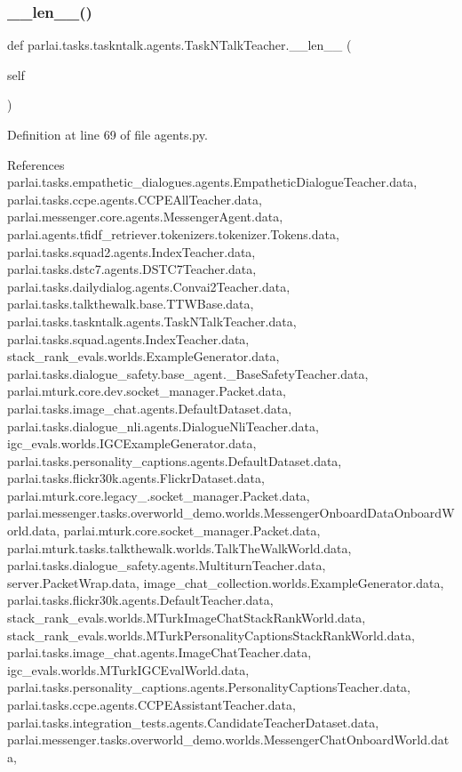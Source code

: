 \subsubsection{\texorpdfstring{\+\_\+\+\_\+len\+\_\+\+\_\+()}{\_\_len\_\_()}}
{\footnotesize\ttfamily def parlai.\+tasks.\+taskntalk.\+agents.\+Task\+N\+Talk\+Teacher.\+\_\+\+\_\+len\+\_\+\+\_\+ (\begin{DoxyParamCaption}\item[{}]{self }\end{DoxyParamCaption})}



Definition at line 69 of file agents.\+py.



References parlai.\+tasks.\+empathetic\+\_\+dialogues.\+agents.\+Empathetic\+Dialogue\+Teacher.\+data, parlai.\+tasks.\+ccpe.\+agents.\+C\+C\+P\+E\+All\+Teacher.\+data, parlai.\+messenger.\+core.\+agents.\+Messenger\+Agent.\+data, parlai.\+agents.\+tfidf\+\_\+retriever.\+tokenizers.\+tokenizer.\+Tokens.\+data, parlai.\+tasks.\+squad2.\+agents.\+Index\+Teacher.\+data, parlai.\+tasks.\+dstc7.\+agents.\+D\+S\+T\+C7\+Teacher.\+data, parlai.\+tasks.\+dailydialog.\+agents.\+Convai2\+Teacher.\+data, parlai.\+tasks.\+talkthewalk.\+base.\+T\+T\+W\+Base.\+data, parlai.\+tasks.\+taskntalk.\+agents.\+Task\+N\+Talk\+Teacher.\+data, parlai.\+tasks.\+squad.\+agents.\+Index\+Teacher.\+data, stack\+\_\+rank\+\_\+evals.\+worlds.\+Example\+Generator.\+data, parlai.\+tasks.\+dialogue\+\_\+safety.\+base\+\_\+agent.\+\_\+\+Base\+Safety\+Teacher.\+data, parlai.\+mturk.\+core.\+dev.\+socket\+\_\+manager.\+Packet.\+data, parlai.\+tasks.\+image\+\_\+chat.\+agents.\+Default\+Dataset.\+data, parlai.\+tasks.\+dialogue\+\_\+nli.\+agents.\+Dialogue\+Nli\+Teacher.\+data, igc\+\_\+evals.\+worlds.\+I\+G\+C\+Example\+Generator.\+data, parlai.\+tasks.\+personality\+\_\+captions.\+agents.\+Default\+Dataset.\+data, parlai.\+tasks.\+flickr30k.\+agents.\+Flickr\+Dataset.\+data, parlai.\+mturk.\+core.\+legacy\+\_.\+socket\+\_\+manager.\+Packet.\+data, parlai.\+messenger.\+tasks.\+overworld\+\_\+demo.\+worlds.\+Messenger\+Onboard\+Data\+Onboard\+World.\+data, parlai.\+mturk.\+core.\+socket\+\_\+manager.\+Packet.\+data, parlai.\+mturk.\+tasks.\+talkthewalk.\+worlds.\+Talk\+The\+Walk\+World.\+data, parlai.\+tasks.\+dialogue\+\_\+safety.\+agents.\+Multiturn\+Teacher.\+data, server.\+Packet\+Wrap.\+data, image\+\_\+chat\+\_\+collection.\+worlds.\+Example\+Generator.\+data, parlai.\+tasks.\+flickr30k.\+agents.\+Default\+Teacher.\+data, stack\+\_\+rank\+\_\+evals.\+worlds.\+M\+Turk\+Image\+Chat\+Stack\+Rank\+World.\+data, stack\+\_\+rank\+\_\+evals.\+worlds.\+M\+Turk\+Personality\+Captions\+Stack\+Rank\+World.\+data, parlai.\+tasks.\+image\+\_\+chat.\+agents.\+Image\+Chat\+Teacher.\+data, igc\+\_\+evals.\+worlds.\+M\+Turk\+I\+G\+C\+Eval\+World.\+data, parlai.\+tasks.\+personality\+\_\+captions.\+agents.\+Personality\+Captions\+Teacher.\+data, parlai.\+tasks.\+ccpe.\+agents.\+C\+C\+P\+E\+Assistant\+Teacher.\+data, parlai.\+tasks.\+integration\+\_\+tests.\+agents.\+Candidate\+Teacher\+Dataset.\+data, parlai.\+messenger.\+tasks.\+overworld\+\_\+demo.\+worlds.\+Messenger\+Chat\+Onboard\+World.\+data, 